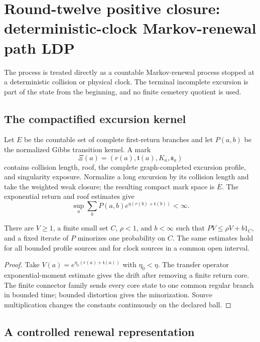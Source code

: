 \section{Round-twelve positive closure: deterministic-clock Markov-renewal path LDP}
\label{sec:r12-a3}

The process is treated directly as a countable Markov-renewal process stopped
at a deterministic collision or physical clock.  The terminal incomplete
excursion is part of the state from the beginning, and no finite cemetery
quotient is used.

\subsection{The compactified excursion kernel}

Let $E$ be the countable set of complete first-return branches and let
$P(a,b)$ be the normalized Gibbs transition kernel.  A mark
\[
 \Xi(a)=(r(a),\mathfrak t(a),K_a,\mathfrak s_a)
\]
contains collision length, roof, the complete graph-completed excursion
profile, and singularity exposure.  Normalize a long excursion by its
collision length and take the weighted weak closure; the resulting compact
mark space is $\overline E$.  The exponential return and roof estimates give
\[
 \sup_a\sum_bP(a,b)e^{\eta(r(b)+\mathfrak t(b))}<\infty.
\]

\begin{lemma}
\label{lem:r12-a3-harris}
There are $V\ge1$, a finite small set $C$, $\rho<1$, and $b<\infty$ such that
$PV\le\rho V+b1_C$, and a fixed iterate of $P$ minorizes one probability on
$C$.  The same estimates hold for all bounded profile sources and for clock
sources in a common open interval.
\end{lemma}

\begin{proof}
Take $V(a)=e^{\eta_0(r(a)+\mathfrak t(a))}$ with $\eta_0<\eta$.  The transfer
operator exponential-moment estimate gives the drift after removing a finite
return core.  The finite connector family sends every core state to one common
regular branch in bounded time; bounded distortion gives the minorization.
Source multiplication changes the constants continuously on the declared
ball.
\end{proof}

\subsection{A controlled renewal representation}

